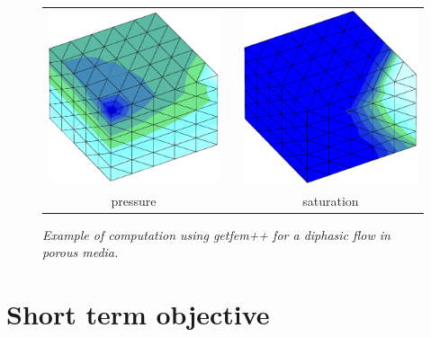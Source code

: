 \documentclass[11pt,a4paper]{article}
\begin{document}
\begin{figure}[htbp]
\begin{center}
\begin{tabular}{ccc}
\includegraphics[width=7cm,angle=0]{getfem_presentation_press.eps} & \hspace{1em} & %
\includegraphics[width=7cm,angle=0]{getfem_presentation_sat.eps} \\ 
pressure &  & saturation
\end{tabular}
\end{center}
\caption{\textit{Example of computation using getfem++ for a diphasic flow
in porous media. }}
\label{fig:body}
\end{figure}

\section{Short term objective}
\end{document}
